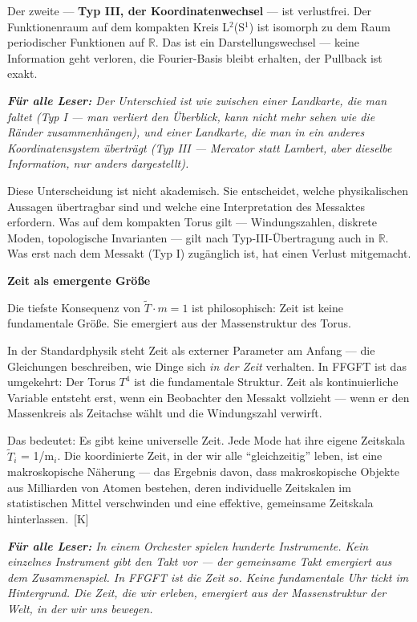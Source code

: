 \documentclass[11pt,oneside]{book}
\newcommand{\status}[1]{\penalty10000\,{\scriptsize\textcolor{gray!60}{[#1]}}}
\newenvironment{laierspur}{%
  \par\vspace{4pt}%
  \noindent\small\itshape\color{blue!60!black}%
  \textbf{Für alle Leser:}\enspace\ignorespaces}{%
  \par\vspace{4pt}\normalsize\normalfont\normalcolor}
\begin{document}
Der zweite — \textbf{Typ III, der Koordinatenwechsel} — ist verlustfrei.
Der Funktionenraum auf dem kompakten Kreis L$^2$(S$^1$) ist isomorph zu dem
Raum periodischer Funktionen auf $\mathbb{R}$. Das ist ein Darstellungswechsel —
keine Information geht verloren, die Fourier-Basis bleibt erhalten,
der Pullback ist exakt.


\begin{laierspur}
Der Unterschied ist wie zwischen einer Landkarte, die man
faltet (Typ I — man verliert den Überblick, kann nicht mehr sehen wie
die Ränder zusammenhängen), und einer Landkarte, die man in ein
anderes Koordinatensystem überträgt (Typ III — Mercator statt Lambert,
aber dieselbe Information, nur anders dargestellt).
\end{laierspur}

Diese Unterscheidung ist nicht akademisch. Sie entscheidet, welche
physikalischen Aussagen übertragbar sind und welche eine Interpretation
des Messaktes erfordern. Was auf dem kompakten Torus gilt — Windungszahlen,
diskrete Moden, topologische Invarianten — gilt nach Typ-III-Übertragung
auch in $\mathbb{R}$. Was erst nach dem Messakt (Typ I) zugänglich ist, hat einen
Verlust mitgemacht.


\textbf{Zeit als emergente Größe}


Die tiefste Konsequenz von $\tilde{T}\cdot m = 1$ ist philosophisch: Zeit ist keine
fundamentale Größe. Sie emergiert aus der Massenstruktur des Torus.


In der Standardphysik steht Zeit als externer Parameter am Anfang — die
Gleichungen beschreiben, wie Dinge sich \textit{in der Zeit} verhalten. In FFGFT
ist das umgekehrt: Der Torus $T^4$ ist die fundamentale Struktur. Zeit als
kontinuierliche Variable entsteht erst, wenn ein Beobachter den Messakt
vollzieht — wenn er den Massenkreis als Zeitachse wählt und die
Windungszahl verwirft.


Das bedeutet: Es gibt keine universelle Zeit. Jede Mode hat ihre eigene
Zeitskala $\tilde{T}_i$ = 1/m$_i$. Die koordinierte Zeit, in der wir alle \enquote{gleichzeitig}
leben, ist eine makroskopische Näherung — das Ergebnis davon, dass
makroskopische Objekte aus Milliarden von Atomen bestehen, deren
individuelle Zeitskalen im statistischen Mittel verschwinden und eine
effektive, gemeinsame Zeitskala hinterlassen. \status{K}


\begin{laierspur}
In einem Orchester spielen hunderte Instrumente. Kein einzelnes
Instrument gibt den Takt vor — der gemeinsame Takt emergiert aus dem
Zusammenspiel. In FFGFT ist die Zeit so. Keine fundamentale Uhr tickt
im Hintergrund. Die Zeit, die wir erleben, emergiert aus der Massenstruktur
der Welt, in der wir uns bewegen.
\end{laierspur}
\end{document}
